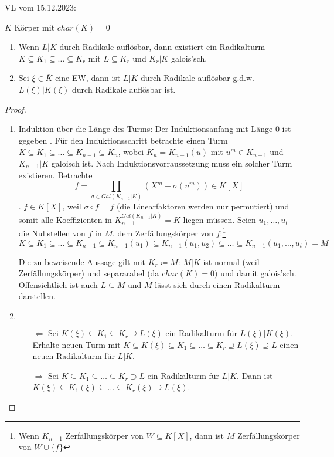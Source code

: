 \documentclass[../main.tex]{subfiles}
\begin{document}
\begin{flushright}
VL vom 15.12.2023:
\end{flushright}
\begin{lemma}\label{theo:3.24}
    $K$ Körper mit $char(K)=0$
    \begin{enumerate}[label=\alph*)]
        \item Wenn $L|K$ durch Radikale auflösbar, dann existiert ein Radikalturm $K\subseteq K_1\subseteq\dots\subseteq K_r$ mit $L\subseteq K_r$ und $K_r|K$ galois'sch.
        \item Sei $\xi \in \overline{K}$  eine EW, dann ist $L|K$ durch Radikale auflösbar g.d.w. $L(\xi)|K(\xi)$ durch Radikale auflösbar ist.
    \end{enumerate}
\end{lemma}
\begin{proof}
    \begin{enumerate}[label=\alph*)]
        \item Induktion über die Länge des Turms:
        Der Induktionsanfang mit Länge $0$ ist gegeben \checkmark.
        Für den Induktionsschritt betrachte einen Turm $K\subseteq K_1\subseteq\dots\subseteq K_{n-1}\subseteq K_n$, wobei $K_n = K_{n-1}(u)$ mit $u^m \in K_{n-1}$ und $K_{n-1}|K$ galoisch ist.
        Nach Induktionsvorraussetzung muss ein solcher Turm existieren.
        Betrachte $$f = \prod_{\sigma\in Gal(K_{n-1}|K)} \left(X^m-\sigma(u^m)\right)\in K[X]$$.
        $f\in K[X]$, weil $\sigma\circ f=f$ (die Linearfaktoren werden nur permutiert) und somit alle Koeffizienten in $K_{n-1}^{Gal(K_{n-1}|K)}=K$ liegen müssen.
        Seien $u_1,\dots,u_t$ die Nullstellen von $f$ in $M$, dem Zerfällungskörper von $f$:\footnote{Wenn $K_{n-1}$ Zerfällungskörper von $W\subseteq K[X]$, dann ist $M$ Zerfällungskörper von $W\cup \{f\}$}
        $$K\subseteq K_1\subseteq\dots\subseteq K_{n-1}\subseteq K_{n-1}(u_1)\subseteq K_{n-1}(u_1,u_2)\subseteq\dots\subseteq K_{n-1}(u_1,\dots,u_t)=M$$

        Die zu beweisende Aussage gilt mit $K_r\coloneqq M$:
        $M|K$ ist normal (weil Zerfällungskörper) und separarabel (da $char(K)=0)$ und damit galois'sch.
        Offensichtlich ist auch $L\subseteq M$ und $M$ lässt sich durch einen Radikalturm darstellen.
        

        \item $ $
        \begin{itemize}
            \item[$\Leftarrow$] Sei $K(\xi) \subseteq K_1\subseteq K_r\supseteq L(\xi)$ ein Radikalturm für $L(\xi)|K(\xi)$.
            Erhalte neuen Turm mit $K\subseteq K(\xi)\subseteq K_1\subseteq\dots\subseteq K_r \supseteq L(\xi)\supseteq L$ einen neuen Radikalturm für $L|K$.
            
            \item[$\Rightarrow$]
            Sei $K\subseteq K_1\subseteq \dots\subseteq K_r\supset L$ ein Radikalturm für $L|K$.
            Dann ist $K(\xi)\subseteq K_1(\xi)\subseteq\dots\subseteq K_r(\xi)\supseteq L(\xi)$.
        \end{itemize}
    \end{enumerate}
\end{proof}
\end{document}
